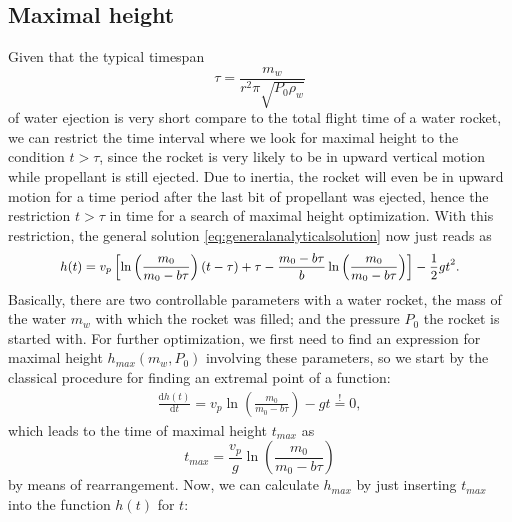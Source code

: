 \documentclass[a4paper,11pt]{report}
\begin{document}
\subsection{Maximal height}
Given that the typical timespan \begin{equation}
\tau = \frac{m_w}{r^2\pi \sqrt{P_0 \rho_w}}
\end{equation} of water ejection is very short compare to the total flight time of a water rocket, we can restrict the time interval where we look for maximal height to the condition $t > \tau$, since the rocket is very likely to be in upward vertical motion while propellant is still ejected. Due to inertia, the rocket will even be in upward motion for a time period after the last bit of propellant was ejected, hence the restriction $t > \tau$ in time for a search of maximal height optimization. With this restriction, the general solution \cref{eq:generalanalyticalsolution} now just reads as \begin{gather}\small\begin{gathered}
h(t) = v_p \left[\ln\left(\frac{m_0}{m_0-b\tau}\right)(t-\tau)+\tau - \frac{m_0-b\tau}{b}\ln\left(\frac{m_0}{m_0-b\tau}\right)\right] - \frac{1}{2}gt^2.
\end{gathered}\end{gather} Basically, there are two controllable parameters with a water rocket, the mass of the water $m_w$ with which the rocket was filled; and the pressure $P_0$ the rocket is started with. For further optimization, we first need to find an expression for maximal height $h_{max}(m_w,P_0)$ involving these parameters, so we start by the classical procedure for finding an extremal point of a function:
\begin{align}
\frac{\mathrm{d}h(t)}{\mathrm{d}t} = v_p \ln\left(\frac{m_0}{m_0-b\tau}\right) - gt \overset{!}{=} 0,
\end{align} which leads to the time of maximal height $t_{max}$ as \begin{equation}
t_{max} = \frac{v_p}{g}\ln\left(\frac{m_0}{m_0-b\tau}\right)
\end{equation} by means of rearrangement. Now, we can calculate $h_{max}$ by just inserting $t_{max}$ into the function $h(t)$ for $t$:
\end{document}

